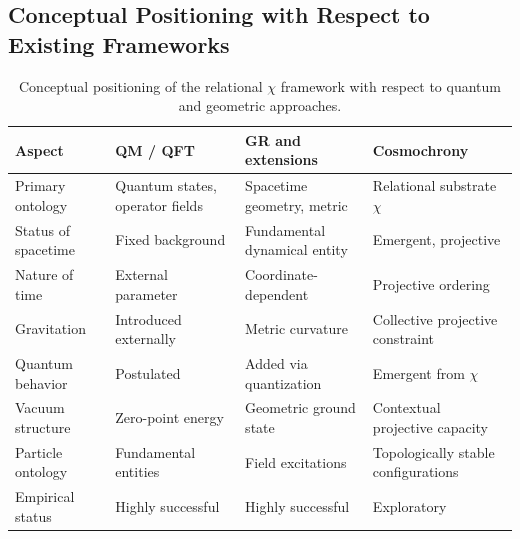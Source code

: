 \subsection{Conceptual Positioning with Respect to Existing Frameworks}
  \label{app:conceptual-positioning}

  \begin{table}[htbp]
    \centering
    \renewcommand{\arraystretch}{1.25}
    \begin{tabular}{|p{3.6cm}|p{3.8cm}|p{3.8cm}|p{4.0cm}|}
      \hline
      \textbf{Aspect} &
      \textbf{QM / QFT} &
      \textbf{GR and extensions} &
      \textbf{Cosmochrony} \\
      \hline
      Primary ontology &
      Quantum states, operator fields &
      Spacetime geometry, metric &
      Relational substrate $\chi$ \\
      \hline
      Status of spacetime &
      Fixed background &
      Fundamental dynamical entity &
      Emergent, projective \\
      \hline
      Nature of time &
      External parameter &
      Coordinate-dependent &
      Projective ordering \\
      \hline
      Gravitation &
      Introduced externally &
      Metric curvature &
      Collective projective constraint \\
      \hline
      Quantum behavior &
      Postulated &
      Added via quantization &
      Emergent from $\chi$ \\
      \hline
      Vacuum structure &
      Zero-point energy &
      Geometric ground state &
      Contextual projective capacity \\
      \hline
      Particle ontology &
      Fundamental entities &
      Field excitations &
      Topologically stable configurations \\
      \hline
      Empirical status &
      Highly successful &
      Highly successful &
      Exploratory \\
      \hline
    \end{tabular}
    \caption{Conceptual positioning of the relational $\chi$ framework
    with respect to quantum and geometric approaches.}
    \label{tab:conceptual-comparison}
  \end{table}


